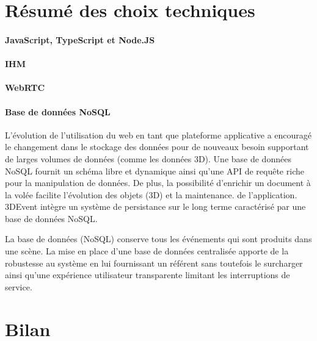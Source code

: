 


\section{Résumé des choix techniques}

\paragraph{JavaScript, TypeScript et Node.JS}
\paragraph{IHM}
\paragraph{WebRTC}
\paragraph{Base de données NoSQL}\label{p:nosql} L'évolution de 
l'utilisation du web en tant que plateforme applicative a encouragé le changement 
dans le stockage des données pour de nouveaux besoin supportant de larges 
volumes de données (comme les données 3D). Une base de données \gls{NoSQL} 
fournit un schéma libre et dynamique ainsi qu'une API de requête riche pour la 
manipulation de données. De plus, la possibilité d'enrichir un document à la volée 
facilite l'évolution des objets (3D) et la maintenance. de l'application.
3DEvent intègre un système de persistance sur le long terme caractérisé par une 
base de données \gls{NoSQL}.

La base de données (\gls{NoSQL}) conserve tous les événements qui 
sont produits dans une scène. 
La mise en place d'une base de données centralisée apporte de la robustesse au 
système en lui fournissant un référent sans toutefois le surcharger ainsi qu'une 
expérience utilisateur transparente limitant les interruptions de service.
\section{Bilan}


